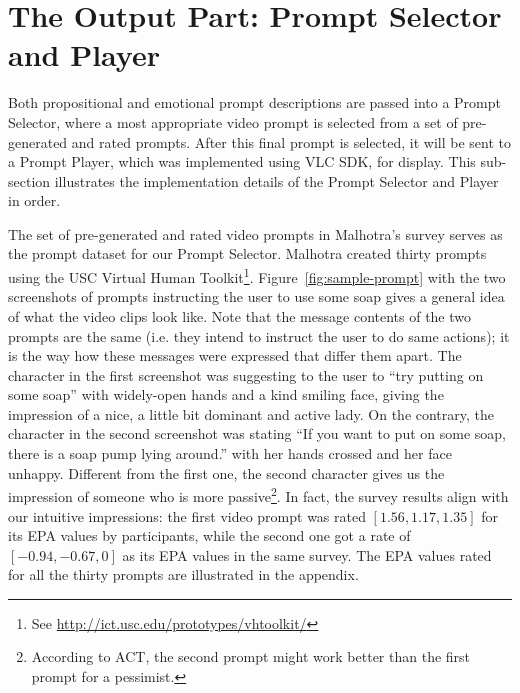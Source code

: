 \section{The Output Part: Prompt Selector and Player}
\label{sec:impl-output}

Both propositional and emotional prompt descriptions are passed into a Prompt Selector, where a most appropriate video prompt is selected from a set of pre-generated and rated prompts. After this final prompt is selected, it will be sent to a Prompt Player, which was implemented using VLC SDK, for display. This sub-section illustrates the implementation details of the Prompt Selector and Player in order.

The set of pre-generated and rated video prompts in Malhotra's survey \cite{malhotra2014} serves as the prompt dataset for our Prompt Selector. Malhotra created thirty prompts using the USC Virtual Human Toolkit\footnote{See \url{http://ict.usc.edu/prototypes/vhtoolkit/}}. Figure~\ref{fig:sample-prompt} with the two screenshots of prompts instructing the user to use some soap gives a general idea of what the video clips look like. Note that the message contents of the two prompts are the same (i.e. they intend to instruct the user to do same actions); it is the way how these messages were expressed that differ them apart. The character in the first screenshot was suggesting to the user to ``try putting on some soap'' with widely-open hands and a kind smiling face, giving the impression of a nice, a little bit dominant and active lady. On the contrary, the character in the second screenshot was stating ``If you want to put on some soap, there is a soap pump lying around.'' with her hands crossed and her face unhappy. Different from the first one, the second character gives us the impression of someone who is more passive\footnote{According to ACT, the second prompt might work better than the first prompt for a pessimist.}. In fact, the survey results align with our intuitive impressions: the first video prompt was rated $[1.56, 1.17, 1.35]$ for its EPA values by participants, while the second one got a rate of  $[-0.94, -0.67, 0]$ as its EPA values in the same survey. The EPA values rated for all the thirty prompts are illustrated in the appendix.


